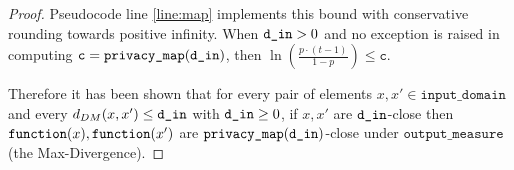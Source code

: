 \documentclass{article}
\begin{document}
\begin{proof}
Pseudocode line \ref{line:map} implements this bound with conservative rounding towards positive infinity. 
When $\texttt{d\_in} > 0$ and no exception is raised in computing $\texttt{c} = \texttt{privacy\_map}(\texttt{d\_in})$, then $\ln\left(\frac{p \cdot (t - 1)}{1 - p}\right) \leq \texttt{c}$. 

Therefore it has been shown that for every pair of elements $x, x' \in \texttt{input\_domain}$ and every $d_{DM}(x, x') \le \texttt{d\_in}$ with $\texttt{d\_in} \ge 0$, 
if $x, x'$ are $\texttt{d\_in}$-close then $\texttt{function}(x),\texttt{function}(x')$ are $\texttt{privacy\_map}(\texttt{d\_in})$-close under $\texttt{output\_measure}$ (the Max-Divergence).
\end{proof}



\end{document}
